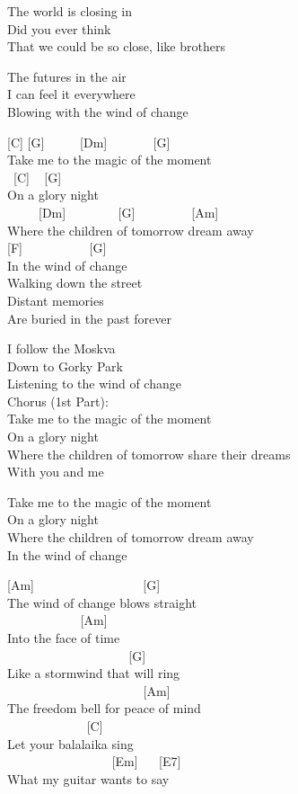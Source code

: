 \documentclass[
  letterpaper,
  twoside=false]{scrbook}
\begin{document}
The world is closing in\\
Did you ever think\\
That we could be so close, like brothers

The future\textquotesingle s in the air\\
I can feel it everywhere\\
Blowing with the wind of change

{[}C{]} {[}G{]} ~ ~ ~ {[}Dm{]} ~ ~ ~ ~ {[}G{]}\\
Take me to the magic of the moment\\
\hspace*{0.333em} ~{[}C{]} ~ {[}G{]}\\
On a glory night\\
\hspace*{0.333em} ~ ~ ~ {[}Dm{]} ~ ~ ~ ~ ~{[}G{]} ~ ~ ~ ~ ~ {[}Am{]}\\
Where the children of tomorrow dream away\\
{[}F{]} ~ ~ ~ ~ ~ ~ {[}G{]}\\
In the wind of change\\
Walking down the street\\
Distant memories\\
Are buried in the past forever

I follow the Moskva\\
Down to Gorky Park\\
Listening to the wind of change\\
Chorus (1st Part):\\
Take me to the magic of the moment\\
On a glory night\\
Where the children of tomorrow share their dreams\\
With you and me

Take me to the magic of the moment\\
On a glory night\\
Where the children of tomorrow dream away\\
In the wind of change

{[}Am{]} ~ ~ ~ ~ ~ ~ ~ ~ ~ ~ {[}G{]}\\
The wind of change blows straight\\
\hspace*{0.333em} ~ ~ ~ ~ ~ ~ ~ {[}Am{]}\\
Into the face of time\\
\hspace*{0.333em} ~ ~ ~ ~ ~ ~ ~ ~ ~ ~ ~ ~{[}G{]}\\
Like a stormwind that will ring\\
\hspace*{0.333em} ~ ~ ~ ~ ~ ~ ~ ~ ~ ~ ~ ~ ~ {[}Am{]}\\
The freedom bell for peace of mind\\
\hspace*{0.333em} ~ ~ ~ ~ ~ ~ ~ ~{[}C{]}\\
Let your balalaika sing\\
\hspace*{0.333em} ~ ~ ~ ~ ~ ~ ~ ~ ~ ~ {[}Em{]} ~ ~{[}E7{]}\\
What my guitar wants to say
\end{document}
